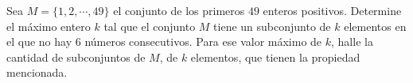 Sea $M = \{ 1,2, \cdots , 49 \}$ el conjunto de los primeros $49$ enteros positivos. Determine el máximo entero $k$ tal que el conjunto $M$ tiene un subconjunto de $k$ elementos en el que no hay $6$ números consecutivos. Para ese valor máximo de $k$, halle la cantidad de subconjuntos de $M$, de $k$ elementos, que tienen la propiedad mencionada.
